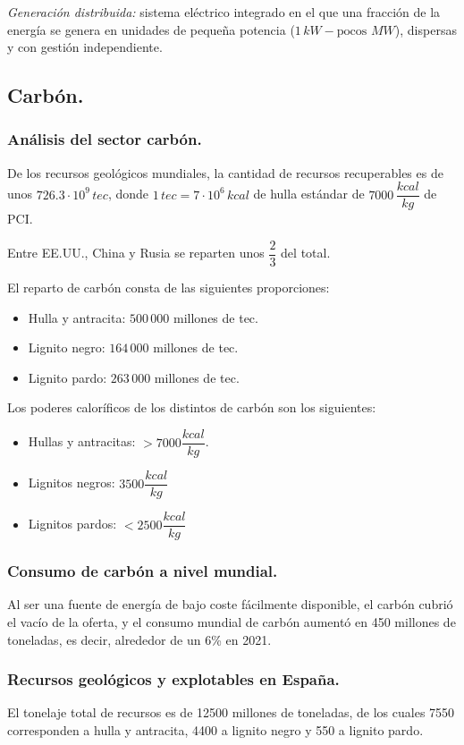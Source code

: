 			
			\textit{Generación distribuida:} sistema eléctrico integrado en el que una fracción de la energía se genera en unidades de pequeña potencia ($1\,kW-\text{pocos }MW$), dispersas y con gestión independiente.
			
			
	\subsection{Carbón.}
		\subsubsection{Análisis del sector carbón.}
			De los recursos geológicos mundiales, la cantidad de recursos recuperables es de unos $726.3\cdot 10^9\,tec$, donde $1\,tec = 7\cdot 10^6\,kcal$ de hulla estándar de $7000\,\dfrac{kcal}{kg}$ de PCI.
			
			
			Entre EE.UU., China y Rusia se reparten unos $\dfrac{2}{3}$ del total. 
			
			
			El reparto de carbón consta de las siguientes proporciones:
			\begin{itemize}
				\item Hulla y antracita: $500\,000$ millones de tec.
				\item Lignito negro: $164\,000$ millones de tec.
				\item Lignito pardo: $263\,000$ millones de tec.
			\end{itemize}
			
			Los poderes caloríficos de los distintos de carbón son los siguientes:
			\begin{itemize}
				\item Hullas y antracitas: $>7000\dfrac{kcal}{kg}$.
				\item Lignitos negros: $3500\dfrac{kcal}{kg}$
				\item Lignitos pardos: $<2500\dfrac{kcal}{kg}$
			\end{itemize}
			
		\subsubsection{Consumo de carbón a nivel mundial.}
			Al ser una fuente de energía de bajo
			coste fácilmente disponible, el carbón
			cubrió el vacío de la oferta, y el
			consumo mundial de carbón aumentó
			en 450 millones de toneladas, es decir,
			alrededor de un 6\% en 2021.
			
		\subsubsection{Recursos geológicos y explotables en España.}
			El tonelaje total de recursos es de 12500 millones de toneladas, de los cuales 7550 corresponden a
			hulla y antracita, 4400 a lignito negro y 550 a lignito pardo.
			
